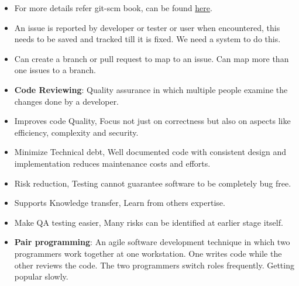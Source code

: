 \documentclass[a4paper]{article}
\begin{document}
\begin{itemize}
    \item For more details refer git-scm book, can be found \href{https://git-scm.com/book/en/v2}{here}.
    \item An issue is reported by developer or tester or user when encountered, this needs to be saved and tracked till it is fixed. We need a system to do this.
    \item Can create a branch or pull request to map to an issue. Can map more than one issues to a branch.
    \item \textbf{Code Reviewing}: Quality assurance in which multiple people examine the changes done by a developer.
    \item Improves code Quality, Focus not just on correctness but also on aspects like efficiency, complexity and security.
    \item Minimize Technical debt, Well documented code with consistent design and implementation reduces maintenance costs and efforts.
    \item Risk reduction, Testing cannot guarantee software to be completely bug free.
    \item Supports Knowledge transfer, Learn from others expertise.
    \item Make QA testing easier, Many risks can be identified at earlier stage itself.
    \item \textbf{Pair programming}: An agile software development technique in which two programmers work together at one workstation. One writes code while the other reviews the code. The two programmers switch roles frequently. Getting popular slowly.
\end{itemize}
\end{document}
